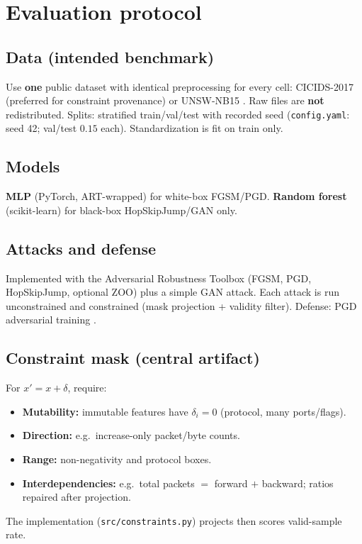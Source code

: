 \documentclass[11pt,a4paper]{article}
\begin{document}
\section{Evaluation protocol}

\subsection{Data (intended benchmark)}
Use \textbf{one} public dataset with identical preprocessing for every cell: CICIDS-2017 \cite{sharafaldin2018cicids} (preferred for constraint provenance) or UNSW-NB15 \cite{moustafa2015unsw}. Raw files are \textbf{not} redistributed. Splits: stratified train/val/test with recorded seed (\texttt{config.yaml}: seed 42; val/test $0.15$ each). Standardization is fit on train only.

\subsection{Models}
\textbf{MLP} (PyTorch, ART-wrapped) for white-box FGSM/PGD.
\textbf{Random forest} (scikit-learn) for black-box HopSkipJump/GAN only.

\subsection{Attacks and defense}
Implemented with the Adversarial Robustness Toolbox (FGSM, PGD, HopSkipJump, optional ZOO) plus a simple GAN attack. Each attack is run unconstrained and constrained (mask projection + validity filter). Defense: PGD adversarial training \cite{madry2018towards}.

\subsection{Constraint mask (central artifact)}
For $x'=x+\delta$, require:
\begin{itemize}
\item \textbf{Mutability:} immutable features have $\delta_i=0$ (protocol, many ports/flags).
\item \textbf{Direction:} e.g.\ increase-only packet/byte counts.
\item \textbf{Range:} non-negativity and protocol boxes.
\item \textbf{Interdependencies:} e.g.\ total packets $=$ forward $+$ backward; ratios repaired after projection.
\end{itemize}
The implementation (\texttt{src/constraints.py}) projects then scores valid-sample rate.
\end{document}
